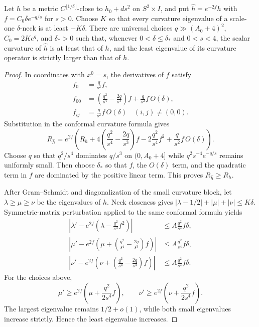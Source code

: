 \begin{lemma}
\label{lem:conformal-surgery-curvature-comparison}
\notready
Let $h$ be a metric $C^{\lfloor1/\delta\rfloor}$-close to
$h_0+ds^2$ on $S^2\times I$, and put $\widehat h=e^{-2f}h$ with
$f=C_0\delta e^{-q/s}$ for $s>0$.  Choose $K$ so that every curvature
eigenvalue of a scale-one $\delta$-neck is at least $-K\delta$.
There are universal choices $q\gg(A_0+4)^2$, $C_0=2Ke^q$, and
$\delta_*>0$ such that, whenever $0<\delta\le\delta_*$ and $0<s<4$,
the scalar curvature of
$\widehat h$ is at least that of $h$, and the least eigenvalue of its
curvature operator is strictly larger than that of $h$.
\end{lemma}

\begin{proof}
In coordinates with $x^0=s$, the derivatives of $f$ satisfy
\begin{align*}
 f_0&=\frac q{s^2}f,\\
 f_{00}&=\left(\frac{q^2}{s^4}-\frac{2q}{s^3}\right)f
          +\frac q{s^2}f\,O(\delta),\\
 f_{ij}&=\frac q{s^2}f\,O(\delta)\quad(i,j)\ne(0,0).
\end{align*}
Substitution in the conformal curvature formula gives
\[
 R_{\widehat h}=e^{2f}\left(
 R_h+4\left(\frac{q^2}{s^4}-\frac{2q}{s^3}\right)f
 -2\frac{q^2}{s^4}f^2+\frac q{s^2}f\,O(\delta)\right).
\]
Choose $q$ so that $q^2/s^4$ dominates $q/s^3$ on
$(0,A_0+4]$ while $q^2s^{-4}e^{-q/s}$ remains uniformly small.  Then
choose $\delta_*$ so that $f$, the $O(\delta)$ term, and the quadratic
term in $f$ are dominated by the positive linear term.  This proves
$R_{\widehat h}\ge R_h$.

After Gram--Schmidt and diagonalization of the small curvature block, let
$\lambda\ge\mu\ge\nu$ be the eigenvalues of $h$.  Neck closeness gives
$|\lambda-1/2|+|\mu|+|\nu|\le K\delta$.  Symmetric-matrix perturbation
applied to the same conformal formula yields
\begin{align*}
 \left|\lambda'-e^{2f}\left(\lambda-\frac{q^2}{s^4}f^2\right)\right|
   &\le A\frac{q^2}{s^4}f\delta,\\
 \left|\mu'-e^{2f}\left(\mu+\left(\frac{q^2}{s^4}-\frac{2q}{s^3}\right)f\right)\right|
   &\le A\frac{q^2}{s^4}f\delta,\\
 \left|\nu'-e^{2f}\left(\nu+\left(\frac{q^2}{s^4}-\frac{2q}{s^3}\right)f\right)\right|
   &\le A\frac{q^2}{s^4}f\delta.
\end{align*}
For the choices above,
\[
 \mu'\ge e^{2f}\left(\mu+\frac{q^2}{2s^4}f\right),
 \qquad
 \nu'\ge e^{2f}\left(\nu+\frac{q^2}{2s^4}f\right).
\]
The largest eigenvalue remains $1/2+o(1)$, while both small eigenvalues
increase strictly.  Hence the least eigenvalue increases.
\end{proof}

